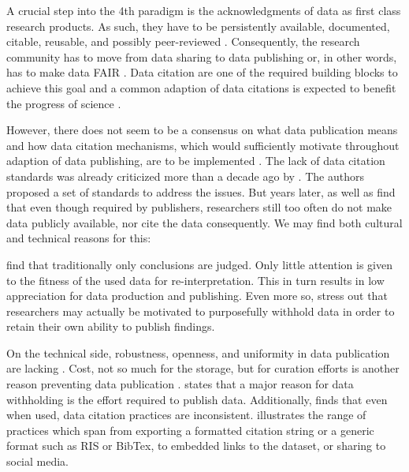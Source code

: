 \documentclass[letterpaper, twocolumn, parskip=half, fontsize=8pt, DIV=calc]{scrartcl}
\begin{document}
A crucial step into the 4th paradigm is the acknowledgments of data as first class research products. As such, they have to be persistently available, documented, citable, reusable, and possibly peer-reviewed \citep{Callaghan2012, Kratz2014}. Consequently, the research community has to move from data sharing to data publishing \citep{Costello2009, Kratz2014} or, in other words, has to make data \gls{FAIR} \citep{Wilkinson2016}. Data citation are one of the required building blocks to achieve this goal and a common adaption of data citations is expected to benefit the progress of science \citep{CODATA2013}. 

However, there does not seem to be a consensus on what data publication means \citep{Kratz2014} and how data citation mechanisms, which would sufficiently motivate throughout adaption of data publishing, are to be implemented \citep{Costello2009}. The lack of data citation standards was already criticized more than a decade ago by \cite{AltKin07}. The authors proposed a set of standards to address the issues. But years later, \cite{Altman2015} as well as \cite{Tenopir2011} find that even though required by publishers, researchers still too often do not make data publicly available, nor cite the data consequently. We may find both cultural and technical reasons for this:

\cite{Lawrence2011} find that traditionally only conclusions are judged. Only little attention is given to the fitness of the used data for re-interpretation. This in turn results in low appreciation for data production and publishing. Even more so, \cite{Tenopir2011} stress out that researchers may actually be motivated to purposefully withhold data in order to retain their own ability to publish findings.

On the technical side, robustness, openness, and uniformity in data publication are lacking \citep{Starr2015, Koltay2016}. Cost, not so much for the storage, but for curation efforts is another reason preventing data publication \citep{Gray2002}.
\cite{Tenopir2011} states that a major reason for data withholding is the effort required to publish data. 
Additionally, \cite{Belter2014} finds that even when used, data citation practices are inconsistent. \cite  {Assante2016} illustrates the range of practices which span from exporting a formatted citation string or a generic format such as RIS or BibTex, to embedded links to the dataset, or sharing to social media. 
\end{document}
